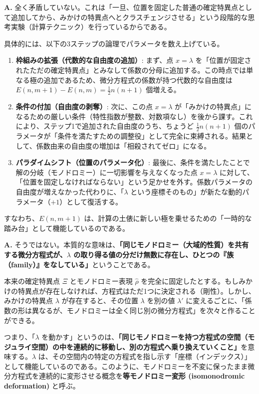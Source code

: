 \begin{Q}
\textbf{A.} 全く矛盾していない。これは「一旦、位置を固定した普通の確定特異点として追加してから、みかけの特異点へとクラスチェンジさせる」という段階的な思考実験（計算テクニック）を行っているからである。

具体的には、以下の3ステップの論理でパラメータを数え上げている。
\begin{enumerate}
    \item \textbf{枠組みの拡張（代数的な自由度の追加）}:
    まず、点 $x=\lambda$ を「位置が固定されたただの確定特異点」とみなして係数の分母に追加する。この時点では単なる極の追加であるため、微分方程式の係数が持つ代数的な自由度は $E(n,m+1) - E(n,m) = \frac{1}{2}n(n+1)$ 個増える。
    
    \item \textbf{条件の付加（自由度の剥奪）}:
    次に、この点 $x=\lambda$ が「みかけの特異点」になるための厳しい条件（特性指数が整数、対数項なし）を後から課す。これにより、ステップ1で追加された自由度のうち、ちょうど $\frac{1}{2}n(n+1)$ 個のパラメータが「条件を満たすための調整役」として完全に束縛される。結果として、係数由来の自由度の増加は「相殺されてゼロ」になる。
    
    \item \textbf{パラダイムシフト（位置のパラメータ化）}:
    最後に、条件を満たしたことで解の分岐（モノドロミー）に一切影響を与えなくなった点 $x=\lambda$ に対して、「位置を固定しなければならない」という足かせを外す。係数パラメータの自由度が増えなかった代わりに、「$\lambda$ という座標そのもの」が新たな動的パラメータ（$+1$）として復活する。
\end{enumerate}
すなわち、$E(n,m+1)$ は、計算の土俵に新しい極を乗せるための「一時的な踏み台」として機能しているのである。
\end{Q}

\begin{Q}
\textbf{A.} そうではない。本質的な意味は、\textbf{「同じモノドロミー（大域的性質）を共有する微分方程式が、$\lambda$ の取り得る値の分だけ無数に存在し、ひとつの『族（family）』をなしている」}ということである。

本来の確定特異点 $\Xi$ とモノドロミー表現 $\hat{\rho}$ を完全に固定したとする。もしみかけの特異点が存在しなければ、方程式はただ1つに決定される（剛性）。しかし、みかけの特異点 $\lambda$ が存在すると、その位置 $\lambda$ を別の値 $\lambda'$ に変えるごとに、「係数の形は異なるが、モノドロミーは全く同じ別の微分方程式」を次々と作ることができる。

つまり、「$\lambda$ を動かす」というのは、\textbf{「同じモノドロミーを持つ方程式の空間（モジュライ空間）の中を連続的に移動し、別の方程式へ乗り換えていくこと」}を意味する。$\lambda$ は、その空間内の特定の方程式を指し示す「座標（インデックス）」として機能しているのである。このように、モノドロミーを不変に保ったまま微分方程式を連続的に変形させる概念を\textbf{等モノドロミー変形 (isomonodromic deformation)} と呼ぶ。
\end{Q}

